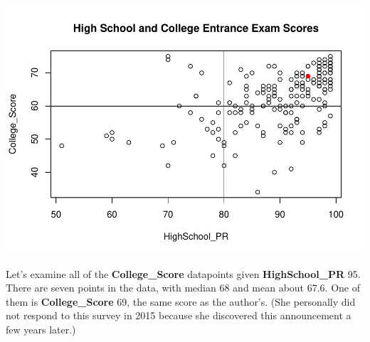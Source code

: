 \documentclass[
]{article}
\newenvironment{Shaded}{\begin{snugshade}}{\end{snugshade}}
\newcommand{\AttributeTok}[1]{\textcolor[rgb]{0.77,0.63,0.00}{#1}}
\newcommand{\DecValTok}[1]{\textcolor[rgb]{0.00,0.00,0.81}{#1}}
\newcommand{\FunctionTok}[1]{\textcolor[rgb]{0.00,0.00,0.00}{#1}}
\newcommand{\NormalTok}[1]{#1}
\newcommand{\SpecialCharTok}[1]{\textcolor[rgb]{0.00,0.00,0.00}{#1}}
\newcommand{\StringTok}[1]{\textcolor[rgb]{0.31,0.60,0.02}{#1}}
\begin{document}
\begin{Shaded}
\end{Shaded}

\includegraphics{PTT_Analysis_of_Test_Scores_Unfinished_files/figure-latex/bivariate-dup-1.pdf}

Let's examine all of the \textbf{College\_Score} datapoints given
\textbf{HighSchool\_PR} 95. There are seven points in the data, with
median 68 and mean about 67.6. One of them is \textbf{College\_Score}
69, the same score as the author's. (She personally did not respond to
this survey in 2015 because she discovered this announcement a few years
later.)

\begin{Shaded}
\end{Shaded}
\end{document}
